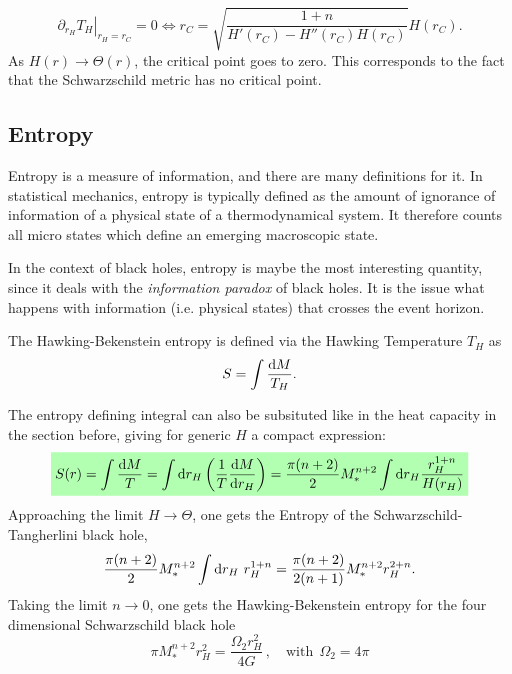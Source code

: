 \documentclass[12pt,a4paper]{report}
\numberwithin{equation}{chapter}
\newcommand{\highlight}[1]{%
  \colorbox{green!30}{$\displaystyle#1$}}
\begin{document}
\begin{equation}\label{eq:rc-generic-H}
\left. \partial_{r_H} T_H \right|_{r_H=r_C}=0
\Leftrightarrow
r_C = \sqrt{\frac{1+n}{H'(r_C) - H''(r_C) H(r_C)}} H(r_C).
\end{equation}
As $H(r)\to\Theta(r)$, the critical point goes to zero. This corresponds to the fact that the Schwarzschild metric has no critical point.

\subsection{Entropy}
Entropy is a measure of information, and there are many definitions for it. In statistical mechanics, entropy is typically defined as the amount of ignorance of information of a physical state of a thermodynamical system. It therefore counts all micro states which define an emerging macroscopic state.

In the context of black holes, entropy is maybe the most interesting quantity, since it deals with the \emph{information paradox} of black holes. It is the issue what happens with information (i.e. physical states) that crosses the event horizon.

The Hawking-Bekenstein entropy is defined via the Hawking Temperature $T_H$ as
\begin{equation}
S = \int \frac{\mathrm{d} M}{T_H}.
\end{equation}

The entropy defining integral can also be subsituted like in the heat capacity in the section before, giving for generic $H$ a compact expression:
%
\begin{equation}\label{eq:generic-entropy-integral}
\highlight{
S(r) = \int \frac{\d M}T = \int
\d r_H \left(\frac 1T  \dd M{r_H} \right)
= \frac{\pi (n+2)}2 M_*^{n+2} \int \d r_H \frac{r_H^{1+n}}{H(r_H)}
}
\end{equation}
Approaching the limit $H\to\Theta$, one gets the Entropy of the Schwarzschild-Tangherlini black hole,
\begin{equation}
\frac{\pi (n+2)}2 M_*^{n+2}  \int \mathrm{d} r_H ~r_H^{1+n}
= \frac{\pi (n+2)}{2(n+1)} M_*^{n+2}  r_H^{2+n}.
\end{equation}
Taking the limit $n\to 0$, one gets the Hawking-Bekenstein entropy for the four dimensional Schwarzschild black hole
\begin{equation}
\pi M_*^{n+2} r_H^2
=
\frac{\Omega_2 r_H^2}{4 G}
\,,\quad
\text{with}~~\Omega_2 = 4\pi
\end{equation}
\end{document}
